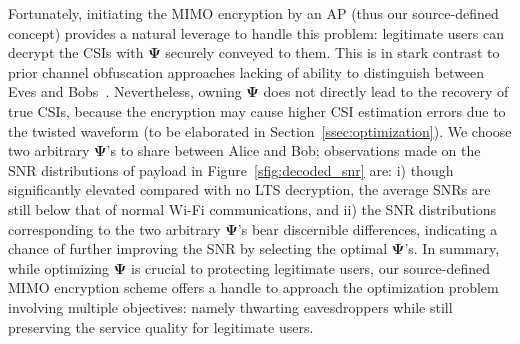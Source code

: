 \documentclass[conference,compsoc]{IEEEtran}
\begin{document}
Fortunately, initiating the MIMO encryption by an AP (thus our source-defined concept) provides a natural leverage to handle this problem: legitimate users can decrypt the CSIs with $\bm{\Psi}$ securely conveyed to them. This is in stark contrast to prior channel obfuscation approaches lacking of ability to distinguish between Eves and Bobs~\cite{PhyCloak-NSDI16,IRShield-SP22}.
Nevertheless, owning $\bm{\Psi}$ does not directly lead to the recovery of true CSIs, because the encryption may cause higher CSI estimation errors due to the twisted waveform (to be elaborated in Section~\ref{ssec:optimization}). 
We choose two arbitrary $\bm{\Psi}$'s to share between Alice and Bob; observations made on the SNR distributions of payload in Figure~\ref{sfig:decoded_snr} are: i) though significantly elevated compared with no LTS decryption, the average SNRs are still below that of normal Wi-Fi communications, and ii) the SNR distributions corresponding to the two arbitrary $\bm{\Psi}$'s bear discernible differences, indicating a chance of further improving the SNR by selecting the optimal $\bm{\Psi}$'s. In summary, 
while optimizing $\bm{\Psi}$ is crucial to protecting legitimate users, our source-defined MIMO encryption scheme offers a handle to approach the optimization problem involving multiple objectives: namely thwarting eavesdroppers while still preserving the service quality for legitimate users.
%


%
\vspace{-1ex}
\end{document}
